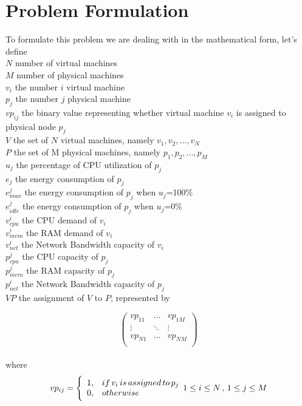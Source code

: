 \documentclass[10pt, conference, compsocconf]{IEEEtran}
\begin{document}
\section{Problem Formulation}
To formulate this problem we are dealing with in the mathematical form, let's
define\\
$N$ number of virtual machines\\
$M$	number of physical machines\\
$v_i$	the number $i$ virtual machine\\
$p_j$	the number $j$ physical machine\\
$vp_{ij}$	the binary value representing whether virtual machine $v_i$ is
assigned to physical node $p_j$\\
$V$	the set of $N$ virtual machines, namely ${v_1,v_2,...,v_N}$\\
$P$	the set of M physical machines, namely ${p_1,p_2,...,p_M}$\\
$u_j$	the percentage of CPU utilization of $p_j$\\
$e_j$	the energy consumption of $p_j$\\
$e_{max}^j$	the energy consumption of $p_j$ when $u_j$=100\%\\
$e_{idle}^j$	the energy consumption of $p_j$ when $u_j$=0\%\\
$v_{cpu}^i$	the CPU demand of $v_i$\\
$v_{mem}^i$ the RAM demand of $v_i$\\
$v_{net}^i$	the Network Bandwidth capacity of $v_i$\\
$p_{cpu}^j$	 the CPU capacity of  $p_j$\\
$p_{mem}^j$ the RAM capacity of  $p_j$\\
$p_{net}^i$	the Network Bandwidth capacity of $p_j$\\
$VP$	the assignment of $V$ to $P$, represented by


\begin{equation}\label{1}
    \left(
  \begin{array}{ccc}
    vp_{11} & \ldots & vp_{1M} \\
    \vdots & \ddots & \vdots \\
    vp_{N1} & \ldots & vp_{NM} \\
  \end{array}
\right)
\end{equation}\\
where\\
\begin{equation}\label{2}
    vp_{ij}=\Bigg\lbrace \begin{array}{cl}
     1, & if\, v_i\, is\, assigned\,to\, p_j \\
    0, & otherwise \\
    \end{array} \\
    1\leq i\leq N \, , \, 1\leq j\leq M
\end{equation}
\end{document}
